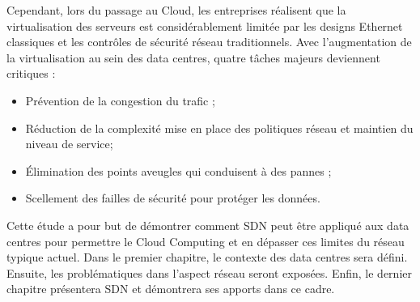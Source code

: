 \par
Cependant, lors du passage au Cloud, les entreprises réalisent que la virtualisation des serveurs est considérablement limitée par les designs Ethernet classiques et les contrôles de sécurité réseau traditionnels. Avec l'augmentation de la virtualisation au sein des data centres, quatre tâches majeurs deviennent critiques :
\begin{itemize}
\item Prévention de la congestion du trafic ;
\item Réduction de la complexité mise en place des politiques réseau et maintien du niveau de service;
\item Élimination des points aveugles qui conduisent à des pannes ;
\item  Scellement des failles de sécurité pour protéger les données. \cite{virtualizedCCCC}\\
\end{itemize}

\par
Cette étude a pour but de démontrer comment SDN peut être appliqué aux data centres pour permettre le Cloud Computing et en dépasser ces limites du réseau typique actuel. Dans le premier chapitre, le contexte des data centres sera défini. Ensuite, les problématiques dans l'aspect réseau seront exposées. Enfin, le dernier chapitre présentera SDN et démontrera ses apports dans ce cadre.

